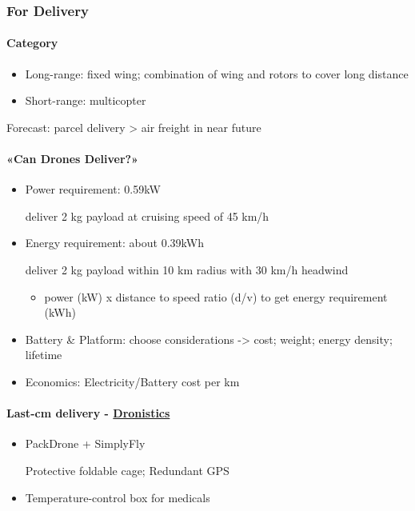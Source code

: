 \documentclass[]{article}
\let\oldparagraph\paragraph
\renewcommand{\paragraph}[1]{\oldparagraph{#1}\mbox{}}
\begin{document}
\subsubsection{For Delivery}\label{header-n88}

\paragraph{Category}\label{header-n89}

\begin{itemize}
\item
  Long-range: fixed wing; combination of wing and rotors to cover long
  distance
\item
  Short-range: multicopter
\end{itemize}

Forecast: parcel delivery \textgreater{} air freight in near future

\paragraph{«Can Drones Deliver?»}\label{header-n96}

\begin{itemize}
\item
  Power requirement: 0.59kW

  deliver 2 kg payload at cruising speed of 45 km/h
\item
  Energy requirement: about 0.39kWh

  deliver 2 kg payload within 10 km radius with 30 km/h headwind

  \begin{itemize}
  \item
    power (kW) x distance to speed ratio (d/v) to get energy requirement
    (kWh)
  \end{itemize}
\item
  Battery \& Platform: choose considerations -\textgreater{} cost;
  weight; energy density; lifetime
\item
  Economics: Electricity/Battery cost per km
\end{itemize}

\paragraph{\texorpdfstring{Last-cm delivery -
\href{https://dronistics.epfl.ch/}{Dronistics}}{Last-cm delivery - Dronistics}}\label{header-n111}

\begin{itemize}
\item
  PackDrone + SimplyFly

  Protective foldable cage; Redundant GPS
\item
  Temperature-control box for medicals
\end{itemize}
\end{document}
